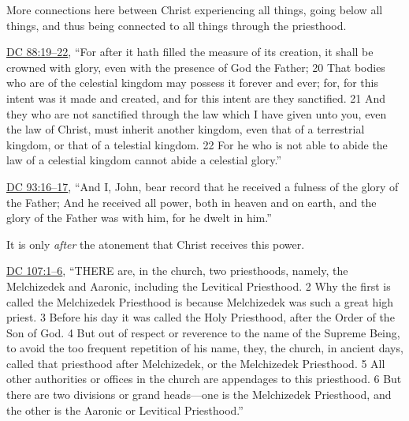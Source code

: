 \begin{compactitem}
\begin{compactitem}
						\begin{compactitem}
							\item More connections here between Christ experiencing all things, going below all things, and thus being connected to all things through the priesthood.
						\end{compactitem}
					\item \hyperref[DC88-19]{DC 88:19--22}, ``For after it hath filled the measure of its creation, it shall be crowned with glory, even with the presence of God the Father; 20 That bodies who are of the celestial kingdom may possess it forever and ever; for, for this intent was it made and created, and for this intent are they sanctified. 21 And they who are not sanctified through the law which I have given unto you, even the law of Christ, must inherit another kingdom, even that of a terrestrial kingdom, or that of a telestial kingdom. 22 For he who is not able to abide the law of a celestial kingdom cannot abide a celestial glory.''
					\item \hyperref[DC93-16]{DC 93:16--17}, ``And I, John, bear record that he received a fulness of the glory of the Father; And he received all power, both in heaven and on earth, and the glory of the Father was with him, for he dwelt in him.''
						\begin{compactitem}
							\item It is only \textit{after} the atonement that Christ receives this power.
						\end{compactitem}
					\item \hyperref[DC107-1]{DC 107:1--6}, ``THERE are, in the church, two priesthoods, namely, the Melchizedek and Aaronic, including the Levitical Priesthood. 2 Why the first is called the Melchizedek Priesthood is because Melchizedek was such a great high priest. 3 Before his day it was called the Holy Priesthood, after the Order of the Son of God. 4 But out of respect or reverence to the name of the Supreme Being, to avoid the too frequent repetition of his name, they, the church, in ancient days, called that priesthood after Melchizedek, or the Melchizedek Priesthood. 5 All other authorities or offices in the church are appendages to this priesthood. 6 But there are two divisions or grand heads---one is the Melchizedek Priesthood, and the other is the Aaronic or Levitical Priesthood.''

\end{compactitem}
\end{compactitem}
